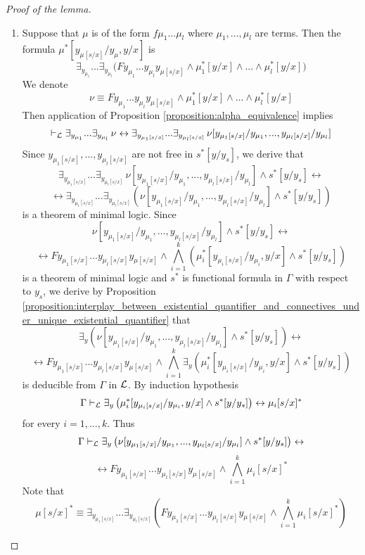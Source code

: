 \documentclass[10pt]{amsart}
\begin{document}
\begin{proof}[Proof of the lemma]
\begin{enumerate}[label=\textbf{(\arabic*)}, leftmargin=3.0em]
		\item Suppose that $\mu$ is of the form $f\mu_1...\mu_l$ where $\mu_1,...,\mu_l$ are terms. Then the formula $\mu^*[y_{\mu[s/x]}/y_\mu,y/x]$ is
		      $$\exists_{y_{\mu_1}}...\exists_{y_{\mu_l}}\big(Fy_{\mu_1}...y_{\mu_l}y_{\mu[s/x]} \wedge \mu_1^*[y/x] \wedge ... \wedge \mu_l^*[y/x]\big)$$
		      We denote
		      $$\nu \equiv Fy_{\mu_1}...y_{\mu_l}y_{\mu[s/x]} \wedge \mu_1^*[y/x] \wedge ... \wedge \mu_l^*[y/x]$$
          Then application of Proposition \ref{proposition:alpha_equivalence} implies
		      $$\vdash_{{\mathcal L}}\exists_{y_{\mu_1}}...\exists_{y_{\mu_l}}\,\nu \leftrightarrow \exists_{y_{\mu_1[s/x]}}...\exists_{y_{\mu_l[s/x]}}\,\nu[y_{\mu_1[s/x]}/y_{\mu_1},...,y_{\mu_l[s/x]}/y_{\mu_l}]$$
		      Since $y_{\mu_1[s/x]},...,y_{\mu_l[s/x]}$ are not free in $s^*[y/y_s]$, we derive that
		      $$\exists_{y_{\mu_1[s/x]}}...\exists_{y_{\mu_l[s/x]}}\,\nu[y_{\mu_1[s/x]}/y_{\mu_1},...,y_{\mu_l[s/x]}/y_{\mu_l}] \wedge s^*[y/y_s] \leftrightarrow$$
		      $$\leftrightarrow \exists_{y_{\mu_1[s/x]}}...\exists_{y_{\mu_l[s/x]}}\left(\nu[y_{\mu_1[s/x]}/y_{\mu_1},...,y_{\mu_l[s/x]}/y_{\mu_l}] \wedge s^*[y/y_s]\right)$$
		      is a theorem of minimal logic. Since
		      $$\nu[y_{\mu_1[s/x]}/y_{\mu_1},...,y_{\mu_l[s/x]}/y_{\mu_l}] \wedge s^*[y/y_s] \leftrightarrow$$
		      $$\leftrightarrow Fy_{\mu_1[s/x]}...y_{\mu_l[s/x]}y_{\mu[s/x]} \wedge \bigwedge_{i=1}^k \left(\mu_i^*[y_{\mu_i[s/x]}/y_{\mu_i},y/x] \wedge s^*[y/y_s]\right)$$
          is a theorem of minimal logic and $s^*$ is functional formula in $\Gamma$ with respect to $y_s$, we derive by Proposition \ref{proposition:interplay_between_existential_quantifier_and_connectives_under_unique_existential_quantifier} that
		      $$\exists_y\left(\nu[y_{\mu_1[s/x]}/y_{\mu_1},...,y_{\mu_l[s/x]}/y_{\mu_l}] \wedge s^*[y/y_s]\right) \leftrightarrow$$
		      $$\leftrightarrow Fy_{\mu_1[s/x]}...y_{\mu_l[s/x]}y_{\mu[s/x]} \wedge \bigwedge_{i=1}^k \exists_y\left(\mu_i^*[y_{\mu_i[s/x]}/y_{\mu_i},y/x] \wedge s^*[y/y_s]\right)$$
		      is deducible from $\Gamma$ in ${\mathcal L}$. By induction hypothesis
		      $$\Gamma \vdash_{{\mathcal L}}\exists_y\left(\mu_i^*[y_{\mu_i[s/x]}/y_{\mu_i},y/x] \wedge s^*[y/y_s]\right) \leftrightarrow \mu_i[s/x]^*$$
		      for every $i=1,...,k$. Thus
		      $$\Gamma \vdash_{{\mathcal L}} \exists_y\left(\nu[y_{\mu_1[s/x]}/y_{\mu_1},...,y_{\mu_l[s/x]}/y_{\mu_l}] \wedge s^*[y/y_s]\right) \leftrightarrow$$
		      $$\leftrightarrow Fy_{\mu_1[s/x]}...y_{\mu_l[s/x]}y_{\mu[s/x]} \wedge \bigwedge_{i=1}^k \mu_i[s/x]^*$$
		      Note that
		      $$\mu[s/x]^* \equiv \exists_{y_{\mu_1[s/x]}}...\exists_{y_{\mu_l[s/x]}}\left(Fy_{\mu_1[s/x]}...y_{\mu_l[s/x]}y_{\mu[s/x]} \wedge \bigwedge_{i=1}^k \mu_i[s/x]^*\right)$$

\end{enumerate}
\end{proof}
\end{document}
